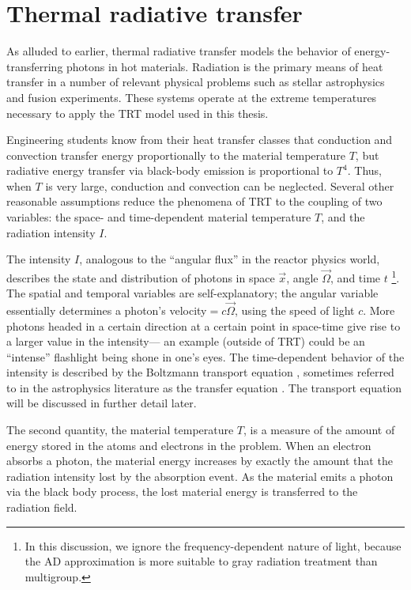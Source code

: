 \section{Thermal radiative transfer}

As alluded to earlier, thermal radiative transfer models the behavior of
energy-transferring photons in hot materials. Radiation is the primary means of
heat transfer in a number of relevant physical problems such as stellar
astrophysics and fusion experiments. These systems operate at the extreme
temperatures necessary to apply the TRT model used in this thesis.

Engineering students know from their heat transfer classes that conduction and
convection transfer energy proportionally to the material
temperature $T$, but radiative energy transfer via black-body emission is
proportional to $T^4$. Thus, when $T$ is very large, conduction and convection
can be neglected. Several other reasonable assumptions reduce the phenomena of
TRT to the coupling of two variables: the space- and time-dependent material
temperature $T$, and the radiation intensity $I$.

The intensity $I$, analogous to the ``angular flux'' in the reactor physics
world,
describes the state and distribution of photons in space $\vec{x}$, angle
$\vec{\Omega}$, and time $t$%
\footnote{In this discussion, we ignore the frequency-dependent nature of light,
because the AD approximation is more suitable to gray radiation treatment than
multigroup.
}. The spatial and temporal variables are self-explanatory; the angular
variable essentially determines a photon's velocity${}=c\vec{\Omega}$, using
the speed of light $c$. More photons headed in a certain direction at a certain
point in space-time give rise to a larger value in the intensity---%
an example (outside of TRT) could be an ``intense'' flashlight being shone in
one's eyes.  The time-dependent behavior of the intensity is described by the
Boltzmann transport equation \cite{Dud1976}, sometimes referred to in the
astrophysics literature as the transfer equation \cite{Mih1984}.
The transport equation will be discussed in further detail later.

The second quantity, the material temperature $T$, is a measure of the amount
of energy stored in the atoms and electrons in the problem. When an electron
absorbs a photon, the material energy increases by exactly the amount that the
radiation intensity lost by the absorption event. As the material emits a
photon via the black body process, the lost material energy is transferred to
the radiation field.

